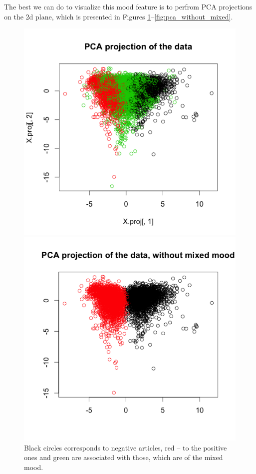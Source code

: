 The best we can do to visualize this mood feature is to perfrom PCA projections on the 2d plane, which is presented in Figures \ref{fig:pca_projection_plot}--\ref{fig:pca_without_mixed}. 

 


\begin{figure}[h!]
	\centering
	\begin{minipage}[h]{0.45\linewidth}
	\includegraphics[width=1.1\linewidth]{images/pca_projection_plot}
	\caption{Black circles corresponds to negative articles, red -- to the positive ones and green are associated with those, which are of the mixed mood.}
	\label{fig:pca_projection_plot}
	\end{minipage} 
	\hfill
	\begin{minipage}[h]{0.45\linewidth}
	\includegraphics[width=1.1\linewidth]{images/pca_without_mixed}

\end{minipage}
\end{figure}
